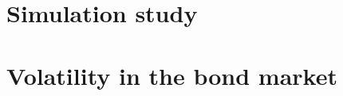 \section{Simulation study}\label{sec:simulation}
\section{Volatility in the bond  market}\label{sec:empirics}
